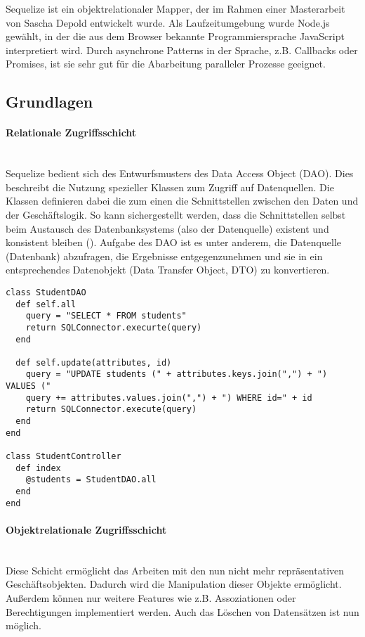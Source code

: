 
Sequelize ist ein objektrelationaler Mapper, der im Rahmen einer Masterarbeit von Sascha Depold entwickelt wurde. Als Laufzeitumgebung wurde Node.js gewählt, in der die aus dem Browser bekannte Programmiersprache JavaScript interpretiert wird. Durch asynchrone Patterns in der Sprache, z.B. Callbacks oder Promises, ist sie sehr gut für die Abarbeitung paralleler Prozesse geeignet.

\subsection{Grundlagen}

\paragraph{Relationale Zugriffsschicht} \hspace{0pt} \\
Sequelize bedient sich des Entwurfsmusters des Data Access Object (DAO). Dies beschreibt die Nutzung spezieller Klassen zum Zugriff auf Datenquellen. Die Klassen definieren dabei die zum einen die Schnittstellen zwischen den Daten und der Geschäftslogik. So kann sichergestellt werden, dass die Schnittstellen selbst beim Austausch des Datenbanksystems (also der Datenquelle) existent und konsistent bleiben (\cite[S. 8]{Piep1}). Aufgabe des DAO ist es unter anderem, die Datenquelle (Datenbank) abzufragen, die Ergebnisse entgegenzunehmen und sie in ein entsprechendes Datenobjekt (Data Transfer Object, DTO) zu konvertieren.

\hspace{1pt}
\begin{lstlisting}[caption=Relationale Zugriffsschicht]
class StudentDAO
  def self.all
    query = "SELECT * FROM students"
    return SQLConnector.execurte(query)
  end
  
  def self.update(attributes, id)
    query = "UPDATE students (" + attributes.keys.join(",") + ") VALUES ("
    query += attributes.values.join(",") + ") WHERE id=" + id
    return SQLConnector.execute(query)
  end
end

class StudentController
  def index
    @students = StudentDAO.all
  end
end
\end{lstlisting}


\paragraph{Objektrelationale Zugriffsschicht} \hspace{0pt} \\
Diese Schicht ermöglicht das Arbeiten mit den nun nicht mehr repräsentativen Geschäftsobjekten. Dadurch wird die Manipulation dieser Objekte ermöglicht. Außerdem können nur weitere Features wie z.B. Assoziationen oder Berechtigungen implementiert werden. Auch das Löschen von Datensätzen ist nun möglich.

